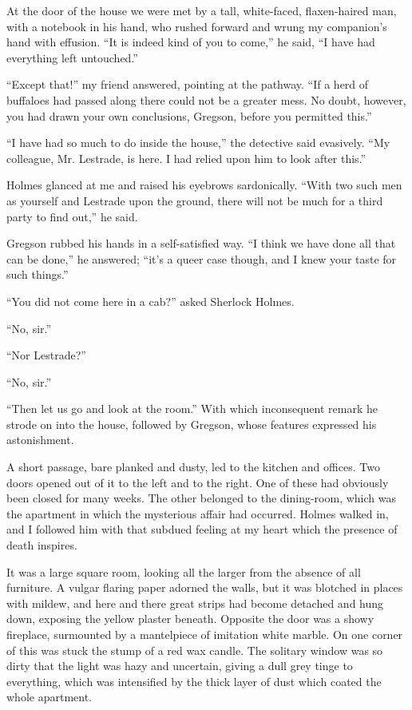 \documentclass[12pt]{book}
\begin{document}
At the door of the house we were met by a tall, white-faced, flaxen-haired man, with a notebook in his hand, who rushed forward and wrung my companion’s hand with effusion. “It is indeed kind of you to come,” he said, “I have had everything left untouched.” 

“Except that!” my friend answered, pointing at the pathway. “If a herd of buffaloes had passed along there could not be a greater mess. No doubt, however, you had drawn your own conclusions, Gregson, before you permitted this.” 

“I have had so much to do inside the house,” the detective said evasively. “My colleague, Mr. Lestrade, is here. I had relied upon him to look after this.” 

Holmes glanced at me and raised his eyebrows sardonically. “With two such men as yourself and Lestrade upon the ground, there will not be much for a third party to find out,” he said. 

Gregson rubbed his hands in a self-satisfied way. “I think we have done all that can be done,” he answered; “it’s a queer case though, and I knew your taste for such things.” 

“You did not come here in a cab?” asked Sherlock Holmes. 

“No, sir.” 

“Nor Lestrade?” 

“No, sir.” 

“Then let us go and look at the room.” With which inconsequent remark he strode on into the house, followed by Gregson, whose features expressed his astonishment. 

A short passage, bare planked and dusty, led to the kitchen and offices. Two doors opened out of it to the left and to the right. One of these had obviously been closed for many weeks. The other belonged to the dining-room, which was the apartment in which the mysterious affair had occurred. Holmes walked in, and I followed him with that subdued feeling at my heart which the presence of death inspires. 

It was a large square room, looking all the larger from the absence of all furniture. A vulgar flaring paper adorned the walls, but it was blotched in places with mildew, and here and there great strips had become detached and hung down, exposing the yellow plaster beneath. Opposite the door was a showy fireplace, surmounted by a mantelpiece of imitation white marble. On one corner of this was stuck the stump of a red wax candle. The solitary window was so dirty that the light was hazy and uncertain, giving a dull grey tinge to everything, which was intensified by the thick layer of dust which coated the whole apartment. 
\end{document}
